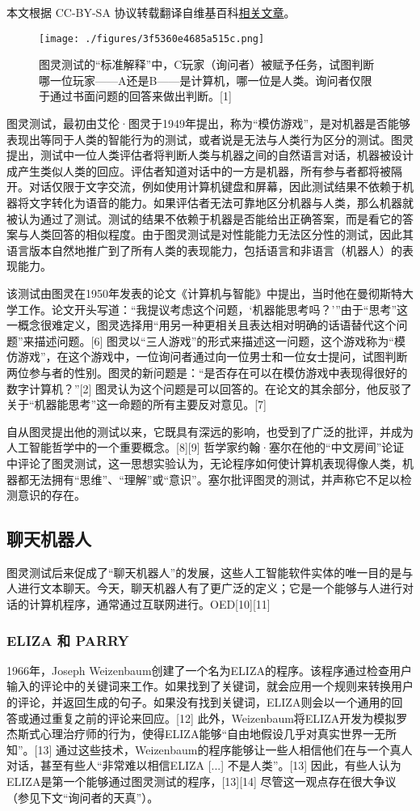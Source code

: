 
本文根据 CC-BY-SA 协议转载翻译自维基百科\href{https://en.wikipedia.org/wiki/Turing_test}{相关文章}。

\begin{figure}[ht]
\centering
\texttt{[image: ./figures/3f5360e4685a515c.png]}
\caption{图灵测试的“标准解释”中，C玩家（询问者）被赋予任务，试图判断哪一位玩家——A还是B——是计算机，哪一位是人类。询问者仅限于通过书面问题的回答来做出判断。[1]} \label{fig_TLCS_1}
\end{figure}
图灵测试，最初由艾伦·图灵于1949年提出，称为“模仿游戏”，是对机器是否能够表现出等同于人类的智能行为的测试，或者说是无法与人类行为区分的测试。图灵提出，测试中一位人类评估者将判断人类与机器之间的自然语言对话，机器被设计成产生类似人类的回应。评估者知道对话中的一方是机器，所有参与者都将被隔开。对话仅限于文字交流，例如使用计算机键盘和屏幕，因此测试结果不依赖于机器将文字转化为语音的能力。如果评估者无法可靠地区分机器与人类，那么机器就被认为通过了测试。测试的结果不依赖于机器是否能给出正确答案，而是看它的答案与人类回答的相似程度。由于图灵测试是对性能能力无法区分性的测试，因此其语言版本自然地推广到了所有人类的表现能力，包括语言和非语言（机器人）的表现能力。

该测试由图灵在1950年发表的论文《计算机与智能》中提出，当时他在曼彻斯特大学工作。论文开头写道：“我提议考虑这个问题，‘机器能思考吗？’”由于“思考”这一概念很难定义，图灵选择用“用另一种更相关且表达相对明确的话语替代这个问题”来描述问题。[6] 图灵以“三人游戏”的形式来描述这一问题，这个游戏称为“模仿游戏”，在这个游戏中，一位询问者通过向一位男士和一位女士提问，试图判断两位参与者的性别。图灵的新问题是：“是否存在可以在模仿游戏中表现得很好的数字计算机？”[2] 图灵认为这个问题是可以回答的。在论文的其余部分，他反驳了关于“机器能思考”这一命题的所有主要反对意见。[7]

自从图灵提出他的测试以来，它既具有深远的影响，也受到了广泛的批评，并成为人工智能哲学中的一个重要概念。[8][9] 哲学家约翰·塞尔在他的“中文房间”论证中评论了图灵测试，这一思想实验认为，无论程序如何使计算机表现得像人类，机器都无法拥有“思维”、“理解”或“意识”。塞尔批评图灵的测试，并声称它不足以检测意识的存在。
\subsection{聊天机器人}  
图灵测试后来促成了“聊天机器人”的发展，这些人工智能软件实体的唯一目的是与人进行文本聊天。今天，聊天机器人有了更广泛的定义；它是一个能够与人进行对话的计算机程序，通常通过互联网进行。OED[10][11]  
\subsubsection{ELIZA 和 PARRY}  
1966年，Joseph Weizenbaum创建了一个名为ELIZA的程序。该程序通过检查用户输入的评论中的关键词来工作。如果找到了关键词，就会应用一个规则来转换用户的评论，并返回生成的句子。如果没有找到关键词，ELIZA则会以一个通用的回答或通过重复之前的评论来回应。[12] 此外，Weizenbaum将ELIZA开发为模拟罗杰斯式心理治疗师的行为，使得ELIZA能够“自由地假设几乎对真实世界一无所知”。[13] 通过这些技术，Weizenbaum的程序能够让一些人相信他们在与一个真人对话，甚至有些人“非常难以相信ELIZA [...] 不是人类”。[13] 因此，有些人认为ELIZA是第一个能够通过图灵测试的程序，[13][14] 尽管这一观点存在很大争议（参见下文“询问者的天真”）。

